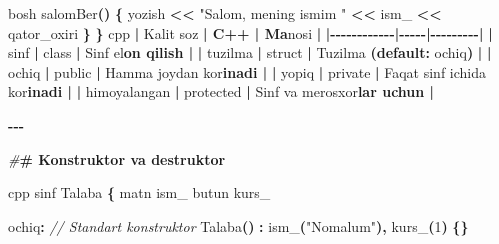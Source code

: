 \documentclass[a4paper,11pt,twoside,openright]{book}
\newenvironment{Shaded}{\begin{snugshade}}{\end{snugshade}}
\newcommand{\CharTok}[1]{\textcolor[rgb]{0.31,0.60,0.02}{#1}}
\newcommand{\CommentTok}[1]{\textcolor[rgb]{0.56,0.35,0.01}{\textit{#1}}}
\newcommand{\ControlFlowTok}[1]{\textcolor[rgb]{0.13,0.29,0.53}{\textbf{#1}}}
\newcommand{\DecValTok}[1]{\textcolor[rgb]{0.00,0.00,0.81}{#1}}
\newcommand{\ErrorTok}[1]{\textcolor[rgb]{0.64,0.00,0.00}{\textbf{#1}}}
\newcommand{\NormalTok}[1]{#1}
\newcommand{\OperatorTok}[1]{\textcolor[rgb]{0.81,0.36,0.00}{\textbf{#1}}}
\newcommand{\PreprocessorTok}[1]{\textcolor[rgb]{0.56,0.35,0.01}{\textit{#1}}}
\newcommand{\StringTok}[1]{\textcolor[rgb]{0.31,0.60,0.02}{#1}}
\newcommand{\VariableTok}[1]{\textcolor[rgb]{0.00,0.00,0.00}{#1}}
\begin{document}
\begin{Shaded}
\begin{Highlighting}[]
\NormalTok{    bosh salomBer}\OperatorTok{()} \OperatorTok{\{}
\NormalTok{        yozish }\OperatorTok{\textless{}\textless{}} \StringTok{"Salom, mening ismim "} \OperatorTok{\textless{}\textless{}} \VariableTok{ism\_} \OperatorTok{\textless{}\textless{}}\NormalTok{ qator\_oxiri}
    \OperatorTok{\}}
\OperatorTok{\}}
\ErrorTok{\textasciigrave{}\textasciigrave{}\textasciigrave{}}\NormalTok{cpp}
\OperatorTok{|}\NormalTok{ Kalit so}\CharTok{\textquotesingle{}z}\ErrorTok{ | C++ | Ma}\CharTok{\textquotesingle{}}\NormalTok{nosi }\OperatorTok{|}
\OperatorTok{|{-}{-}{-}{-}{-}{-}{-}{-}{-}{-}{-}{-}|{-}{-}{-}{-}{-}|{-}{-}{-}{-}{-}{-}{-}{-}{-}|}
\OperatorTok{|} \ErrorTok{\textasciigrave{}}\NormalTok{sinf}\ErrorTok{\textasciigrave{}} \OperatorTok{|} \ErrorTok{\textasciigrave{}}\NormalTok{class}\ErrorTok{\textasciigrave{}} \OperatorTok{|}\NormalTok{ Sinf e}\CharTok{\textquotesingle{}l}\ErrorTok{on qilish |}
\OperatorTok{|} \ErrorTok{\textasciigrave{}}\NormalTok{tuzilma}\ErrorTok{\textasciigrave{}} \OperatorTok{|} \ErrorTok{\textasciigrave{}}\NormalTok{struct}\ErrorTok{\textasciigrave{}} \OperatorTok{|}\NormalTok{ Tuzilma }\OperatorTok{(}\ControlFlowTok{default}\OperatorTok{:} \ErrorTok{\textasciigrave{}}\NormalTok{ochiq}\ErrorTok{\textasciigrave{}}\OperatorTok{)} \OperatorTok{|}
\OperatorTok{|} \ErrorTok{\textasciigrave{}}\NormalTok{ochiq}\ErrorTok{\textasciigrave{}} \OperatorTok{|} \ErrorTok{\textasciigrave{}}\NormalTok{public}\ErrorTok{\textasciigrave{}} \OperatorTok{|}\NormalTok{ Hamma joydan ko}\CharTok{\textquotesingle{}r}\ErrorTok{inadi |}
\OperatorTok{|} \ErrorTok{\textasciigrave{}}\NormalTok{yopiq}\ErrorTok{\textasciigrave{}} \OperatorTok{|} \ErrorTok{\textasciigrave{}}\NormalTok{private}\ErrorTok{\textasciigrave{}} \OperatorTok{|}\NormalTok{ Faqat sinf ichida ko}\CharTok{\textquotesingle{}r}\ErrorTok{inadi |}
\OperatorTok{|} \ErrorTok{\textasciigrave{}}\NormalTok{himoyalangan}\ErrorTok{\textasciigrave{}} \OperatorTok{|} \ErrorTok{\textasciigrave{}}\NormalTok{protected}\ErrorTok{\textasciigrave{}} \OperatorTok{|}\NormalTok{ Sinf va merosxo}\CharTok{\textquotesingle{}r}\ErrorTok{lar uchun |}

\OperatorTok{{-}{-}{-}}

\PreprocessorTok{\#}\ErrorTok{\# Konstruktor va destruktor}

\ErrorTok{\textasciigrave{}\textasciigrave{}\textasciigrave{}}\NormalTok{cpp}
\NormalTok{sinf Talaba }\OperatorTok{\{}
\NormalTok{    matn }\VariableTok{ism\_}
\NormalTok{    butun }\VariableTok{kurs\_}

\NormalTok{ochiq}\OperatorTok{:}
    \CommentTok{// Standart konstruktor}
\NormalTok{    Talaba}\OperatorTok{()} \OperatorTok{:} \VariableTok{ism\_}\OperatorTok{(}\StringTok{"Noma\textquotesingle{}lum"}\OperatorTok{),} \VariableTok{kurs\_}\OperatorTok{(}\DecValTok{1}\OperatorTok{)} \OperatorTok{\{\}}


\end{Highlighting}
\end{Shaded}
\end{document}
